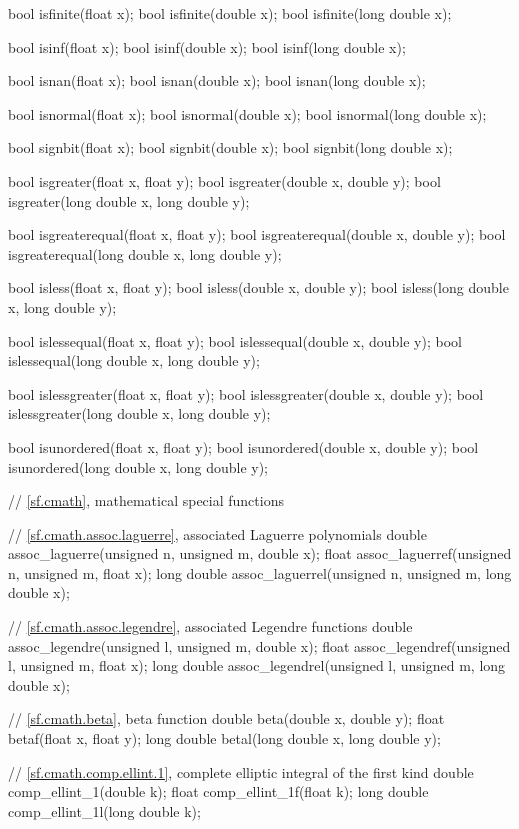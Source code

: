 \begin{codeblock}
{  bool isfinite(float x);
  bool isfinite(double x);
  bool isfinite(long double x);

  bool isinf(float x);
  bool isinf(double x);
  bool isinf(long double x);

  bool isnan(float x);
  bool isnan(double x);
  bool isnan(long double x);

  bool isnormal(float x);
  bool isnormal(double x);
  bool isnormal(long double x);

  bool signbit(float x);
  bool signbit(double x);
  bool signbit(long double x);

  bool isgreater(float x, float y);
  bool isgreater(double x, double y);
  bool isgreater(long double x, long double y);

  bool isgreaterequal(float x, float y);
  bool isgreaterequal(double x, double y);
  bool isgreaterequal(long double x, long double y);

  bool isless(float x, float y);
  bool isless(double x, double y);
  bool isless(long double x, long double y);

  bool islessequal(float x, float y);
  bool islessequal(double x, double y);
  bool islessequal(long double x, long double y);

  bool islessgreater(float x, float y);
  bool islessgreater(double x, double y);
  bool islessgreater(long double x, long double y);

  bool isunordered(float x, float y);
  bool isunordered(double x, double y);
  bool isunordered(long double x, long double y);

  // \ref{sf.cmath}, mathematical special functions

  // \ref{sf.cmath.assoc.laguerre}, associated Laguerre polynomials
  double       assoc_laguerre(unsigned n, unsigned m, double x);
  float        assoc_laguerref(unsigned n, unsigned m, float x);
  long double  assoc_laguerrel(unsigned n, unsigned m, long double x);

  // \ref{sf.cmath.assoc.legendre}, associated Legendre functions
  double       assoc_legendre(unsigned l, unsigned m, double x);
  float        assoc_legendref(unsigned l, unsigned m, float x);
  long double  assoc_legendrel(unsigned l, unsigned m, long double x);

  // \ref{sf.cmath.beta}, beta function
  double       beta(double x, double y);
  float        betaf(float x, float y);
  long double  betal(long double x, long double y);

  // \ref{sf.cmath.comp.ellint.1}, complete elliptic integral of the first kind
  double       comp_ellint_1(double k);
  float        comp_ellint_1f(float k);
  long double  comp_ellint_1l(long double k);

}
\end{codeblock}
